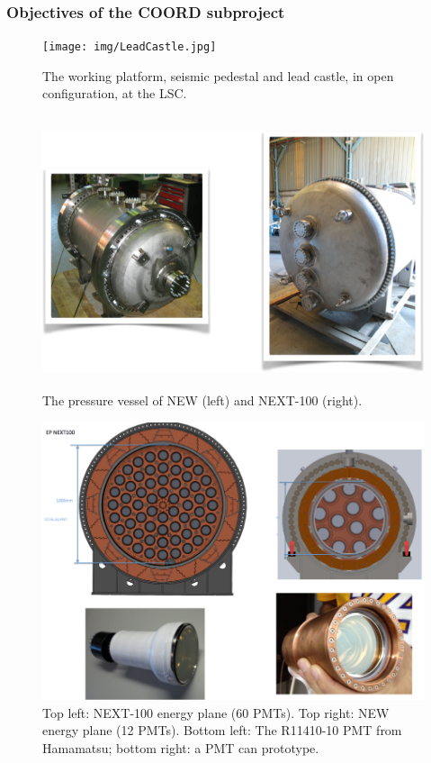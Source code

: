 %
%

\subsubsection*{Objectives of the COORD subproject}

\begin{figure}
\centering
\texttt{[image: img/LeadCastle.jpg]}
\caption{The working platform, seismic pedestal and lead castle, in open configuration, at the LSC.} \label{fig:INFRA}
\end{figure}


\begin{figure}
\centering
\includegraphics[height=8cm]{img/PV.png}
\caption{The pressure vessel of NEW (left) and NEXT-100 (right).} \label{fig:PV}
\end{figure}

\begin{figure}[t!b!]
\begin{center}
\includegraphics[width=.9\textwidth]{img/EPNext-100.png}
\end{center}
\caption{Top left: NEXT-100 energy plane (60 PMTs). Top right: NEW energy plane (12 PMTs).
Bottom left: The R11410-10 PMT from Hamamatsu; bottom right: a PMT can prototype.} \label{fig:EnergyPlane}
\end{figure}

